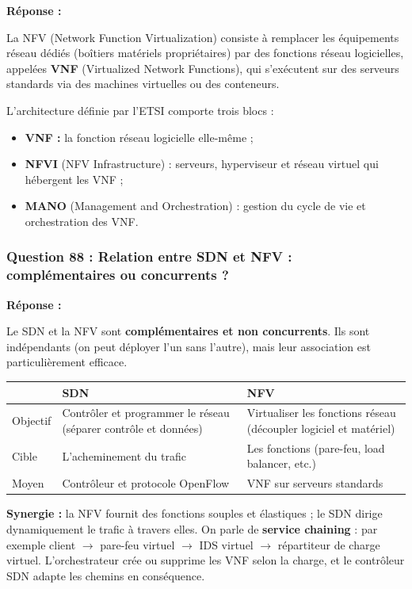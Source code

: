 \documentclass[12pt,a4paper]{article}
\newcommand{\reponse}{\textbf{Réponse :}\par}
\newcommand{\fl}{\ensuremath{\rightarrow}}
\begin{document}
\reponse
La NFV (Network Function Virtualization) consiste à remplacer les
équipements réseau dédiés (boîtiers matériels propriétaires) par des
fonctions réseau logicielles, appelées \textbf{VNF} (Virtualized Network
Functions), qui s'exécutent sur des serveurs standards via des machines
virtuelles ou des conteneurs.

L'architecture définie par l'ETSI comporte trois blocs :
\begin{itemize}
    \item \textbf{VNF :} la fonction réseau logicielle elle-même ;
    \item \textbf{NFVI} (NFV Infrastructure) : serveurs, hyperviseur et
    réseau virtuel qui hébergent les VNF ;
    \item \textbf{MANO} (Management and Orchestration) : gestion du cycle
    de vie et orchestration des VNF.
\end{itemize}



\subsubsection*{Question 88 : Relation entre SDN et NFV : complémentaires ou concurrents ?}

\reponse
Le SDN et la NFV sont \textbf{complémentaires et non concurrents}. Ils
sont indépendants (on peut déployer l'un sans l'autre), mais leur
association est particulièrement efficace.

\begin{longtable}{|L{2.4cm}|L{6.1cm}|L{6.1cm}|}
\hline
 & \textbf{SDN} & \textbf{NFV} \\ \hline
Objectif & Contrôler et programmer le réseau (séparer contrôle et
données) & Virtualiser les fonctions réseau (découpler logiciel et
matériel) \\ \hline
Cible & L'acheminement du trafic & Les fonctions (pare-feu, load
balancer, etc.) \\ \hline
Moyen & Contrôleur et protocole OpenFlow & VNF sur serveurs standards \\
\hline
\end{longtable}

\textbf{Synergie :} la NFV fournit des fonctions souples et élastiques ;
le SDN dirige dynamiquement le trafic à travers elles. On parle de
\textbf{service chaining} : par exemple client \fl{} pare-feu virtuel
\fl{} IDS virtuel \fl{} répartiteur de charge virtuel. L'orchestrateur
crée ou supprime les VNF selon la charge, et le contrôleur SDN adapte
les chemins en conséquence.
\end{document}
